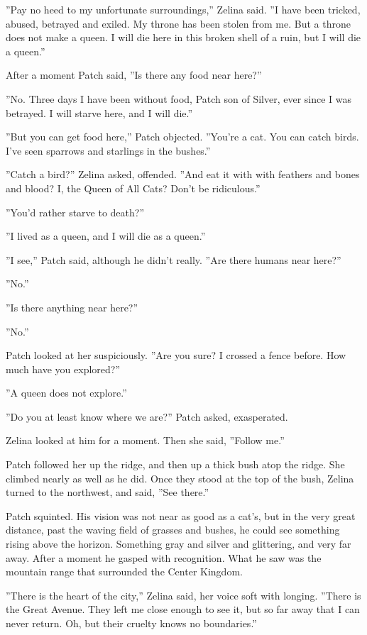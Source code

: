 \documentclass[11pt]{article}
\begin{document}
''Pay no heed to my unfortunate surroundings,'' Zelina said. ''I have been tricked, abused, betrayed and exiled. My throne has been stolen from me. But a throne does not make a queen. I will die here in this broken shell of a ruin, but I will die a queen.''\par
After a moment Patch said, ''Is there any food near here?''\par
''No. Three days I have been without food, Patch son of Silver, ever since I was betrayed. I will starve here, and I will die.''\par
 ''But you can get food here,'' Patch objected. ''You're a cat. You can catch birds. I've seen sparrows and starlings in the bushes.''\par
 ''Catch a bird?'' Zelina asked, offended. ''And eat it with %
 with feathers and bones and blood? I, the Queen of All Cats? Don't be ridiculous.''\par
 ''You'd rather starve to death?''\par
 ''I lived as a queen, and I will die as a queen.''\par
 ''I see,'' Patch said, although he didn't really. ''Are there humans near here?''\par
 ''No.''\par
 ''Is there anything near here?''\par
 ''No.''\par
 Patch looked at her suspiciously. ''Are you sure? I crossed a fence before. How much have you explored?''\par
 ''A queen does not explore.''\par
 ''Do you at least know where we are?'' Patch asked, exasperated.\par
 Zelina looked at him for a moment. Then she said, ''Follow me.''\par
 Patch followed her up the ridge, and then up a thick bush atop the ridge. She climbed nearly as well as he did. Once they stood at the top of the bush, Zelina turned to the northwest, and said, ''See there.''\par
 Patch squinted. His vision was not near as good as a cat's, but in the very great distance, past the waving field of grasses and bushes, he could see %
 something %
 rising above the horizon. Something gray and silver and glittering, and very far away. After a moment he gasped with recognition. What he saw was the mountain range that surrounded the Center Kingdom.\par
 ''There is the heart of the city,'' Zelina said, her voice soft with longing. ''There is the Great Avenue. They left me close enough to see it, but so far away that I can never return. Oh, but their cruelty knows no boundaries.''\par
\end{document}
